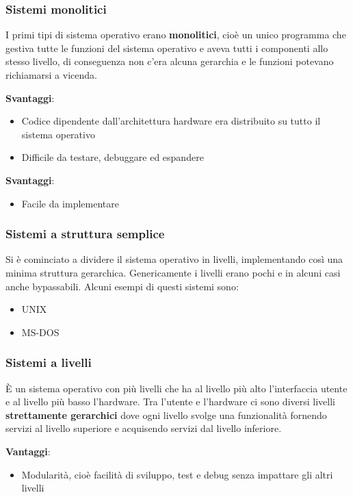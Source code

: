 \documentclass[a4paper]{article}
\begin{document}
\subsubsection{Sistemi monolitici}
I primi tipi di sistema operativo erano \textbf{monolitici}, cioè un unico programma
che gestiva tutte le funzioni del sistema operativo e aveva tutti i componenti allo
stesso livello, di conseguenza non c'era alcuna gerarchia e le funzioni potevano
richiamarsi a vicenda.

\vspace{1em}
\noindent
\textbf{Svantaggi}:
\begin{itemize}
  \item Codice dipendente dall'architettura hardware era distribuito su tutto il sistema
    operativo

  \item Difficile da testare, debuggare ed espandere
\end{itemize}

\noindent
\textbf{Svantaggi}:
\begin{itemize}
  \item Facile da implementare
\end{itemize}

\subsubsection{Sistemi a struttura semplice}
Si è cominciato a dividere il sistema operativo in livelli, implementando così una 
minima struttura gerarchica. Genericamente i livelli erano pochi e in alcuni casi
anche bypassabili. Alcuni esempi di questi sistemi sono:
\begin{itemize}
  \item UNIX
  \item MS-DOS
\end{itemize}

\subsubsection{Sistemi a livelli}
È un sistema operativo con più livelli che ha al livello più alto l'interfaccia utente
e al livello più basso l'hardware. Tra l'utente e l'hardware ci sono diversi livelli
\textbf{strettamente gerarchici} dove ogni livello svolge una funzionalità fornendo
servizi al livello superiore e acquisendo servizi dal livello inferiore.

\vspace{1em}
\noindent
\textbf{Vantaggi}:
\begin{itemize}
  \item Modularità, cioè facilità di sviluppo, test e debug senza impattare gli altri
    livelli
\end{itemize}
\end{document}
